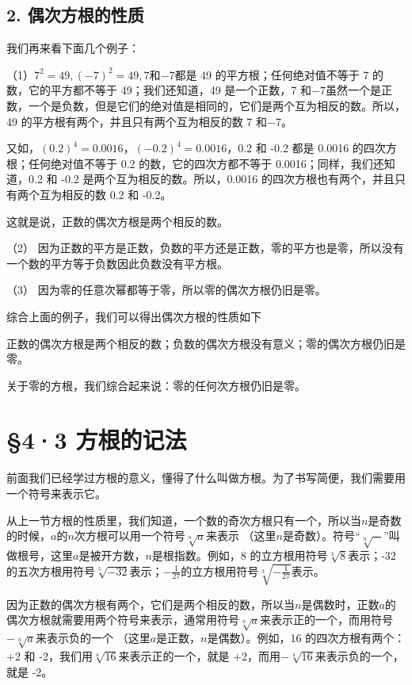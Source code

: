 \subsection{2. 偶次方根的性质}

我们再来看下面几个例子：

（1）\(7^{2} = 49, (-7)^{2} = 49, 7\)和\(-7\)都是 49
的平方根；任何绝对值不等于 7 的数，它的平方都不等于 49；我们还知道，49
是一个正数，7
和\(-7\)虽然一个是正数，一个是负数，但是它们的绝对值是相同的，它们是两个互为相反的数。所以，49
的平方根有两个，并且只有两个互为相反的数 7 和\(-7\)。

又如，\((0.2)^{4} = 0.0016\)，\((-0.2)^{4} = 0.0016\)，0.2 和 -0.2 都是
0.0016 的四次方根；任何绝对值不等于 0.2 的数，它的四次方都不等于
0.0016；同样，我们还知道，0.2 和 -0.2 是两个互为相反的数。所以，0.0016
的四次方根也有两个，并且只有两个互为相反的数 0.2 和 -0.2。

这就是说，正数的偶次方根是两个相反的数。

（2）
因为正数的平方是正数，负数的平方还是正数，零的平方也是零，所以没有一个数的平方等于负数因此负数没有平方根。

（3） 因为零的任意次幂都等于零，所以零的偶次方根仍旧是零。

综合上面的例子，我们可以得出偶次方根的性质如下

正数的偶次方根是两个相反的数；负数的偶次方根没有意义；零的偶次方根仍旧是零。


关于零的方根，我们综合起来说：零的任何次方根仍旧是零。

\section{§4·3 方根的记法}

前面我们已经学过方根的意义，懂得了什么叫做方根。为了书写简便，我们需要用一个符号来表示它。

从上一节方根的性质里，我们知道，一个数的奇次方根只有一个，所以当\(n\)是奇数的时候，\(a\)的\(n\)次方根可以用一个符号\(\sqrt[n]{a}\)来表示
（这里\(n\)是奇数）。符号``\(\sqrt[n]{-}\)''叫做根号，这里\(a\)是被开方数，\(n\)是根指数。例如，8
的立方根用符号\(\sqrt[3]{8}\)表示；-32
的五次方根用符号\(\sqrt[5]{-32}\)表示；\(-\frac{1}{27}\)的立方根用符号\(\sqrt[3]{-\frac{1}{27}}\)表示。

因为正数的偶次方根有两个，它们是两个相反的数，所以当\(n\)是偶数时，正数\(a\)的偶次方根就需要用两个符号来表示，通常用符号\(\sqrt[n]{a}\)来表示正的一个，而用符号\(-\sqrt[n]{a}\)来表示负的一个
（这里\(a\)是正数，\(n\)是偶数）。例如，16 的四次方根有两个：+2 和
-2，我们用\(\sqrt[4]{16}\)来表示正的一个，就是
+2，而用\(-\sqrt[4]{16}\)来表示负的一个，就是 -2。

